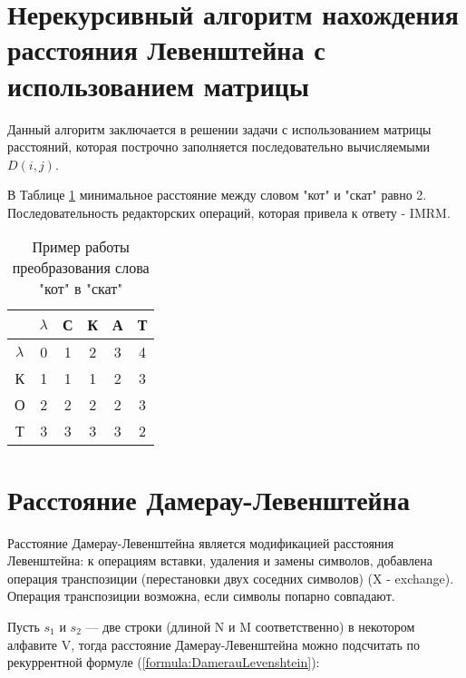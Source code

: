 	\section{Нерекурсивный алгоритм нахождения расстояния Левенштейна с использованием матрицы}
	
	
	Данный алгоритм заключается в решении задачи с использованием матрицы расстояний, которая построчно заполняется последовательно вычисляемыми $D(i, j)$. 
	
		В Таблице \ref{table:example:Levenshtein} минимальное расстояние между
	словом "кот" и "скат" равно 2. Последовательность редакторских операций,
	которая привела к ответу - IMRM.
	
	\begin{table}[h]
		\caption{Пример работы преобразования слова "кот" в "скат"}
		\centering
		\begin{tabular}{|c|c|c|c|c|c|}
			\hline
			& $\lambda$ & С & К & А & Т \\ \hline
			$\lambda$ & 0 & 1 & 2 & 3 & 4 \\ \hline
			К & 1 & 1 & 1 & 2 & 3 \\ \hline
			О & 2 & 2 & 2 & 2 & 3 \\ \hline
			Т & 3 & 3 & 3 & 3 & \cellcolor[HTML]{FFCCC9}2 \\ \hline
		\end{tabular}
		\label{table:example:Levenshtein}
	\end{table}
    \section{Расстояние Дамерау-Левенштейна}  
    Расстояние Дамерау-Левенштейна является модификацией расстояния Левенштейна:
    к операциям вставки, удаления и замены символов, добавлена операция транспозиции (перестановки
    двух соседних символов) (X - exchange). Операция транспозиции возможна, если символы попарно совпадают.

    Пусть $s_{1}$ и $s_{2}$ — две строки (длиной N и M соответственно) в некотором алфавите V,
    тогда расстояние Дамерау-Левенштейна можно подсчитать по рекуррентной формуле (\ref{formula:DamerauLevenshtein}):

